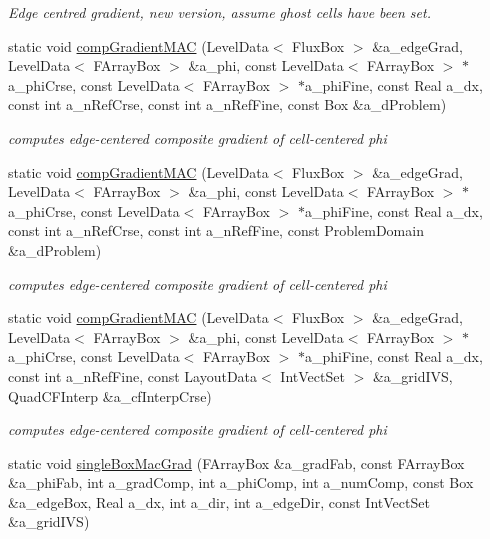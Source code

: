 \begin{DoxyCompactItemize}
\begin{DoxyCompactList}\small\item\em Edge centred gradient, new version, assume ghost cells have been set. \end{DoxyCompactList}\item 
static void \hyperlink{class_gradient_a50d364c2e9951e70a74200537ebbd73d}{comp\-Gradient\-M\-A\-C} (Level\-Data$<$ Flux\-Box $>$ \&a\-\_\-edge\-Grad, Level\-Data$<$ F\-Array\-Box $>$ \&a\-\_\-phi, const Level\-Data$<$ F\-Array\-Box $>$ $\ast$a\-\_\-phi\-Crse, const Level\-Data$<$ F\-Array\-Box $>$ $\ast$a\-\_\-phi\-Fine, const Real a\-\_\-dx, const int a\-\_\-n\-Ref\-Crse, const int a\-\_\-n\-Ref\-Fine, const Box \&a\-\_\-d\-Problem)
\begin{DoxyCompactList}\small\item\em computes edge-\/centered composite gradient of cell-\/centered phi \end{DoxyCompactList}\item 
static void \hyperlink{class_gradient_ab53c80ecc42d684acd3456c47b4db5f2}{comp\-Gradient\-M\-A\-C} (Level\-Data$<$ Flux\-Box $>$ \&a\-\_\-edge\-Grad, Level\-Data$<$ F\-Array\-Box $>$ \&a\-\_\-phi, const Level\-Data$<$ F\-Array\-Box $>$ $\ast$a\-\_\-phi\-Crse, const Level\-Data$<$ F\-Array\-Box $>$ $\ast$a\-\_\-phi\-Fine, const Real a\-\_\-dx, const int a\-\_\-n\-Ref\-Crse, const int a\-\_\-n\-Ref\-Fine, const Problem\-Domain \&a\-\_\-d\-Problem)
\begin{DoxyCompactList}\small\item\em computes edge-\/centered composite gradient of cell-\/centered phi \end{DoxyCompactList}\item 
static void \hyperlink{class_gradient_a82e5e91499de8d5cbddf3c42528c9421}{comp\-Gradient\-M\-A\-C} (Level\-Data$<$ Flux\-Box $>$ \&a\-\_\-edge\-Grad, Level\-Data$<$ F\-Array\-Box $>$ \&a\-\_\-phi, const Level\-Data$<$ F\-Array\-Box $>$ $\ast$a\-\_\-phi\-Crse, const Level\-Data$<$ F\-Array\-Box $>$ $\ast$a\-\_\-phi\-Fine, const Real a\-\_\-dx, const int a\-\_\-n\-Ref\-Fine, const Layout\-Data$<$ Int\-Vect\-Set $>$ \&a\-\_\-grid\-I\-V\-S, Quad\-C\-F\-Interp \&a\-\_\-cf\-Interp\-Crse)
\begin{DoxyCompactList}\small\item\em computes edge-\/centered composite gradient of cell-\/centered phi \end{DoxyCompactList}\item 
\hypertarget{class_gradient_a54d7c331f9bf1ee1b95f6683b5ef4ca3}{static void \hyperlink{class_gradient_a54d7c331f9bf1ee1b95f6683b5ef4ca3}{single\-Box\-Mac\-Grad} (F\-Array\-Box \&a\-\_\-grad\-Fab, const F\-Array\-Box \&a\-\_\-phi\-Fab, int a\-\_\-grad\-Comp, int a\-\_\-phi\-Comp, int a\-\_\-num\-Comp, const Box \&a\-\_\-edge\-Box, Real a\-\_\-dx, int a\-\_\-dir, int a\-\_\-edge\-Dir, const Int\-Vect\-Set \&a\-\_\-grid\-I\-V\-S)}\label{class_gradient_a54d7c331f9bf1ee1b95f6683b5ef4ca3}


\end{DoxyCompactItemize}
